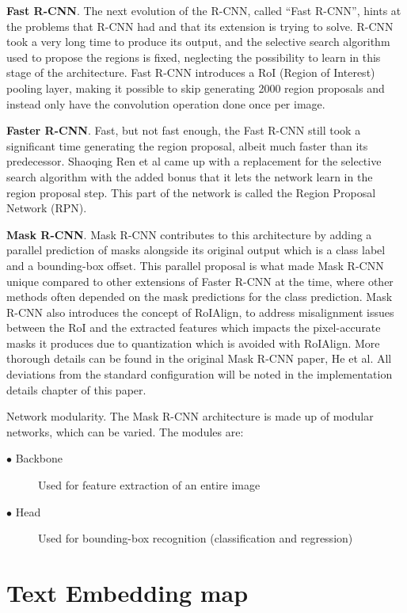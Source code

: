 \documentclass[english, bibtex]{kththesis}
\begin{document}
\textbf{Fast R-CNN}. The next evolution of the R-CNN, called “Fast R-CNN”\cite{Girshick_2015_ICCV}, hints at the problems that R-CNN had and that its extension is trying to solve. R-CNN took a very long time to produce its output, and the selective search algorithm used to propose the regions is fixed, neglecting the possibility to learn in this stage of the architecture. Fast R-CNN introduces a RoI (Region of Interest) pooling layer, making it possible to skip generating 2000 region proposals and instead only have the convolution operation done once per image. 

\textbf{Faster R-CNN}. Fast, but not fast enough, the Fast R-CNN still took a significant time generating the region proposal, albeit much faster than its predecessor. Shaoqing Ren et al\cite{7485869} came up with a replacement for the selective search algorithm with the added bonus that it lets the network learn in the region proposal step. This part of the network is called the Region Proposal Network (RPN). 

\textbf{Mask R-CNN}. Mask R-CNN contributes to this architecture by adding a parallel prediction of masks alongside its original output which is a class label and a bounding-box offset. This parallel proposal is what made Mask R-CNN unique compared to other extensions of Faster R-CNN at the time, where other methods often depended on the mask predictions for the class prediction. Mask R-CNN also introduces the concept of RoIAlign, to address misalignment issues between the RoI and the extracted features which impacts the pixel-accurate masks it produces due to quantization which is avoided with RoIAlign. More thorough details can be found in the original Mask R-CNN paper, He et al\cite{DBLP:journals/corr/HeGDG17}. All deviations from the standard configuration will be noted in the implementation details chapter of this paper.

Network modularity. The Mask R-CNN architecture is made up of modular networks, which can be varied. The modules are:

\begin{description}
\item[$\bullet$ Backbone] Used for feature extraction of an entire image
\item[$\bullet$ Head] Used for bounding-box recognition (classification and regression)
\end{description}

\section{Text Embedding map}
\end{document}
